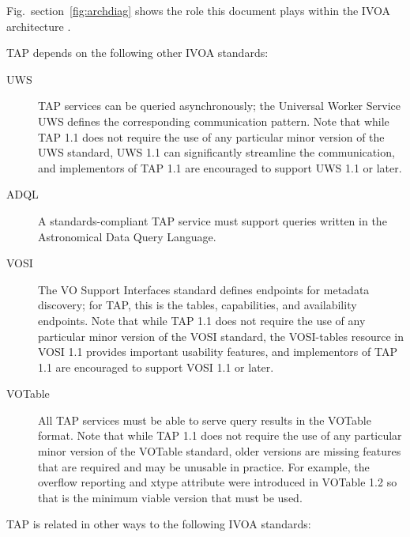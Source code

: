 \documentclass[11pt,letter]{ivoa}
\begin{document}
Fig.~section~\ref{fig:archdiag} shows the role this document plays within the
IVOA architecture \citep{note:VOARCH}.

TAP depends on the following other IVOA standards:

\begin{description}

\item[UWS \citep{2016ivoa.spec.1024H}] TAP services can be queried
asynchronously; the Universal Worker Service UWS defines the
corresponding communication pattern.  Note that while TAP 1.1 does not
require the use of any particular minor version of the UWS standard, 
UWS 1.1 can significantly streamline the communication, and
implementors of TAP 1.1 are encouraged to support UWS 1.1 or later.

\item[ADQL \citep{2008ivoa.spec.1030O}] A standards-compliant TAP
service must support queries written in the Astronomical Data Query
Language.

\item[VOSI \citep{std:VOSI11}] The VO Support Interfaces standard
defines endpoints for metadata discovery; for TAP, this is the tables,
capabilities, and availability endpoints. Note that while TAP 1.1 does not
require the use of any particular minor version of the VOSI standard, 
the VOSI-tables resource in VOSI 1.1 provides important usability features, and
implementors of TAP 1.1 are encouraged to support VOSI 1.1 or later.

\item[VOTable \citep{2013ivoa.spec.0920O}] All TAP services must be able
to serve query results in the VOTable format. Note that while TAP 1.1 does not
require the use of any particular minor version of the VOTable standard, older 
versions are missing features that are required and may be unusable in practice.
For example, the overflow reporting and xtype attribute were introduced in 
VOTable 1.2 so that is the minimum viable version that must be used.
\end{description}


TAP is related in other ways to the following IVOA standards:
\end{document}
